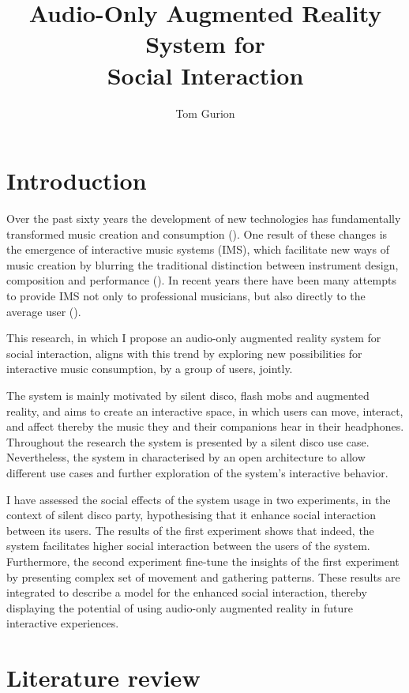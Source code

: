 \documentclass[a4paper,11pt]{article}
\title{Audio-Only Augmented Reality System for\\Social Interaction}
\author{Tom Gurion}
\begin{document}
\maketitle

\tableofcontents

\section{Introduction}

Over the past sixty years the development of new technologies has fundamentally transformed music creation and consumption (\cite{hargreaves99}).
One result of these changes is the emergence of interactive music systems (IMS), which facilitate new ways of music creation by blurring the traditional distinction between instrument design, composition and performance (\cite{drummond09}).
In recent years there have been many attempts to provide IMS not only to professional musicians, but also directly to the average user (\cite{stimulant13}).

This research, in which I propose an audio-only augmented reality system for social interaction, aligns with this trend by exploring new possibilities for interactive music consumption, by a group of users, jointly.

The system is mainly motivated by silent disco, flash mobs and augmented reality, and aims to create an interactive space, in which users can move, interact, and affect thereby the music they and their companions hear in their headphones.
Throughout the research the system is presented by a silent disco use case.
Nevertheless, the system in characterised by an open architecture to allow different use cases and further exploration of the system's interactive behavior.

I have assessed the social effects of the system usage in two experiments, in the context of silent disco party, hypothesising that it enhance social interaction between its users.
The results of the first experiment shows that indeed, the system facilitates higher social interaction between the users of the system.
Furthermore, the second experiment fine-tune the insights of the first experiment by presenting complex set of movement and gathering patterns.
These results are integrated to describe a model for the enhanced social interaction, thereby displaying the potential of using audio-only augmented reality in future interactive experiences.

\section{Literature review}
\end{document}
